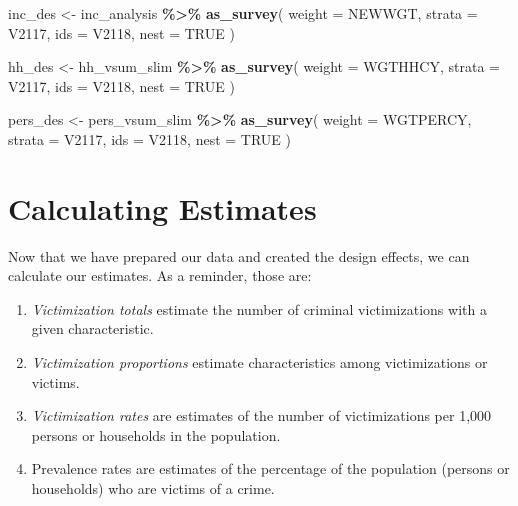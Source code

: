 \documentclass[
]{krantz}
\makeatletter
\newenvironment{Shaded}{\begin{snugshade}}{\end{snugshade}}
\newcommand{\AttributeTok}[1]{\textcolor[rgb]{0.27,0.27,0.27}{#1}}
\newcommand{\ConstantTok}[1]{\textcolor[rgb]{0.37,0.37,0.37}{#1}}
\newcommand{\FunctionTok}[1]{\textcolor[rgb]{0.27,0.27,0.27}{\textbf{#1}}}
\newcommand{\NormalTok}[1]{#1}
\newcommand{\OtherTok}[1]{\textcolor[rgb]{0.37,0.37,0.37}{#1}}
\newcommand{\SpecialCharTok}[1]{\textcolor[rgb]{0.43,0.43,0.43}{\textbf{#1}}}
\newenvironment{kframe}{%
\medskip{}
\setlength{\fboxsep}{.8em}
 \def\at@end@of@kframe{}%
 \ifinner\ifhmode%
  \def\at@end@of@kframe{\end{minipage}}%
  \begin{minipage}{\columnwidth}%
 \fi\fi%
 \def\FrameCommand##1{\hskip\@totalleftmargin \hskip-\fboxsep
 \colorbox{shadecolor}{##1}\hskip-\fboxsep
     \hskip-\linewidth \hskip-\@totalleftmargin \hskip\columnwidth}%
 \MakeFramed {\advance\hsize-\width
   \@totalleftmargin\z@ \linewidth\hsize
   \@setminipage}}%
 {\par\unskip\endMakeFramed%
 \at@end@of@kframe}
\renewenvironment{Shaded}{\begin{kframe}}{\end{kframe}}
\makeatother
\begin{document}
\begin{Shaded}
\begin{Highlighting}[]
\NormalTok{inc\_des }\OtherTok{\textless{}{-}}\NormalTok{ inc\_analysis }\SpecialCharTok{\%\textgreater{}\%}
  \FunctionTok{as\_survey}\NormalTok{(}
    \AttributeTok{weight =}\NormalTok{ NEWWGT,}
    \AttributeTok{strata =}\NormalTok{ V2117,}
    \AttributeTok{ids =}\NormalTok{ V2118,}
    \AttributeTok{nest =} \ConstantTok{TRUE}
\NormalTok{  )}

\NormalTok{hh\_des }\OtherTok{\textless{}{-}}\NormalTok{ hh\_vsum\_slim }\SpecialCharTok{\%\textgreater{}\%}
  \FunctionTok{as\_survey}\NormalTok{(}
    \AttributeTok{weight =}\NormalTok{ WGTHHCY,}
    \AttributeTok{strata =}\NormalTok{ V2117,}
    \AttributeTok{ids =}\NormalTok{ V2118,}
    \AttributeTok{nest =} \ConstantTok{TRUE}
\NormalTok{  )}

\NormalTok{pers\_des }\OtherTok{\textless{}{-}}\NormalTok{ pers\_vsum\_slim }\SpecialCharTok{\%\textgreater{}\%}
  \FunctionTok{as\_survey}\NormalTok{(}
    \AttributeTok{weight =}\NormalTok{ WGTPERCY,}
    \AttributeTok{strata =}\NormalTok{ V2117,}
    \AttributeTok{ids =}\NormalTok{ V2118,}
    \AttributeTok{nest =} \ConstantTok{TRUE}
\NormalTok{  )}
\end{Highlighting}
\end{Shaded}

\hypertarget{calculating-estimates}{%
\section{Calculating Estimates}\label{calculating-estimates}}

Now that we have prepared our data and created the design effects, we can calculate our estimates. As a reminder, those are:

\begin{enumerate}
\def\labelenumi{\arabic{enumi}.}
\item
  \emph{Victimization totals} estimate the number of criminal victimizations with a given characteristic.
\item
  \emph{Victimization proportions} estimate characteristics among victimizations or victims.
\item
  \emph{Victimization rates} are estimates of the number of victimizations per 1,000 persons or households in the population.
\item
  Prevalence rates are estimates of the percentage of the population (persons or households) who are victims of a crime.
\end{enumerate}
\end{document}
